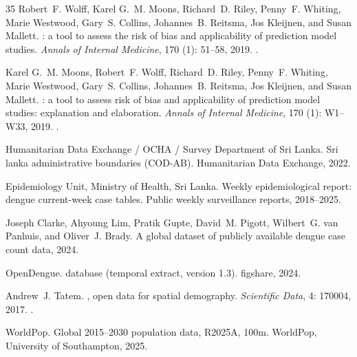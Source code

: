 \documentclass[11pt,a4paper]{article}
\begin{document}
\begin{thebibliography}{35}
Robert~F. Wolff, Karel G.~M. Moons, Richard~D. Riley, Penny~F. Whiting, Marie
  Westwood, Gary~S. Collins, Johannes~B. Reitsma, Jos Kleijnen, and Susan
  Mallett.
: a tool to assess the risk of bias and applicability of
  prediction model studies.
\newblock \emph{Annals of Internal Medicine}, 170 (1):
  51--58, 2019.
\newblock {}.

Karel G.~M. Moons, Robert~F. Wolff, Richard~D. Riley, Penny~F. Whiting, Marie
  Westwood, Gary~S. Collins, Johannes~B. Reitsma, Jos Kleijnen, and Susan
  Mallett.
: a tool to assess risk of bias and applicability of
  prediction model studies: explanation and elaboration.
\newblock \emph{Annals of Internal Medicine}, 170 (1):
  W1--W33, 2019.
\newblock {}.

{Humanitarian Data Exchange / OCHA / Survey Department of Sri Lanka}.
\newblock Sri lanka administrative boundaries ({COD-AB}).
\newblock Humanitarian Data Exchange, 2022.

{Epidemiology Unit, Ministry of Health, Sri Lanka}.
\newblock Weekly epidemiological report: dengue current-week case tables.
\newblock Public weekly surveillance reports, 2018--2025.

Joseph Clarke, Ahyoung Lim, Pratik Gupte, David~M. Pigott, Wilbert~G. van
  Panhuis, and Oliver~J. Brady.
\newblock A global dataset of publicly available dengue case count data, 2024.

{OpenDengue}.
 database (temporal extract, version 1.3).
\newblock figshare, 2024.

Andrew~J. Tatem.
, open data for spatial demography.
\newblock \emph{Scientific Data}, 4: 170004, 2017.
\newblock {}.

{WorldPop}.
\newblock Global 2015--2030 population data, {R2025A}, 100m.
\newblock WorldPop, University of Southampton, 2025.


\end{thebibliography}
\end{document}
